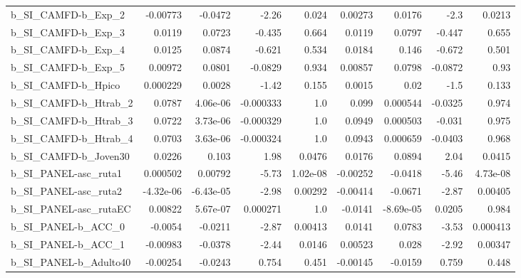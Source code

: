 \begin{tabular}{lrrrrrrrr}
b\_SI\_CAMFD-b\_Exp\_2         &    -0.00773 &      -0.0472 &     -2.26 &    0.024 &    0.00273 &      0.0176 &         -2.3 &        0.0213 \\
b\_SI\_CAMFD-b\_Exp\_3         &      0.0119 &       0.0723 &    -0.435 &    0.664 &     0.0119 &      0.0797 &       -0.447 &         0.655 \\
b\_SI\_CAMFD-b\_Exp\_4         &      0.0125 &       0.0874 &    -0.621 &    0.534 &     0.0184 &       0.146 &       -0.672 &         0.501 \\
b\_SI\_CAMFD-b\_Exp\_5         &     0.00972 &       0.0801 &   -0.0829 &    0.934 &    0.00857 &      0.0798 &      -0.0872 &          0.93 \\
b\_SI\_CAMFD-b\_Hpico         &    0.000229 &       0.0028 &     -1.42 &    0.155 &     0.0015 &        0.02 &         -1.5 &         0.133 \\
b\_SI\_CAMFD-b\_Htrab\_2       &      0.0787 &     4.06e-06 & -0.000333 &      1.0 &      0.099 &    0.000544 &      -0.0325 &         0.974 \\
b\_SI\_CAMFD-b\_Htrab\_3       &      0.0722 &     3.73e-06 & -0.000329 &      1.0 &     0.0949 &    0.000503 &       -0.031 &         0.975 \\
b\_SI\_CAMFD-b\_Htrab\_4       &      0.0703 &     3.63e-06 & -0.000324 &      1.0 &     0.0943 &    0.000659 &      -0.0403 &         0.968 \\
b\_SI\_CAMFD-b\_Joven30       &      0.0226 &        0.103 &      1.98 &   0.0476 &     0.0176 &      0.0894 &         2.04 &        0.0415 \\
b\_SI\_PANEL-asc\_ruta1       &    0.000502 &      0.00792 &     -5.73 & 1.02e-08 &   -0.00252 &     -0.0418 &        -5.46 &      4.73e-08 \\
b\_SI\_PANEL-asc\_ruta2       &   -4.32e-06 &    -6.43e-05 &     -2.98 &  0.00292 &   -0.00414 &     -0.0671 &        -2.87 &       0.00405 \\
b\_SI\_PANEL-asc\_rutaEC      &     0.00822 &     5.67e-07 &  0.000271 &      1.0 &    -0.0141 &   -8.69e-05 &       0.0205 &         0.984 \\
b\_SI\_PANEL-b\_ACC\_0         &     -0.0054 &      -0.0211 &     -2.87 &  0.00413 &     0.0141 &      0.0783 &        -3.53 &      0.000413 \\
b\_SI\_PANEL-b\_ACC\_1         &    -0.00983 &      -0.0378 &     -2.44 &   0.0146 &    0.00523 &       0.028 &        -2.92 &       0.00347 \\
b\_SI\_PANEL-b\_Adulto40      &    -0.00254 &      -0.0243 &     0.754 &    0.451 &   -0.00145 &     -0.0159 &        0.759 &         0.448 \\

\end{tabular}
